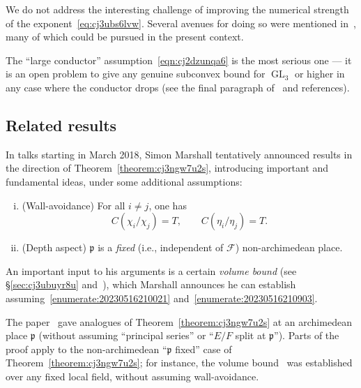 \documentclass[reqno]{amsart}
\DeclareMathOperator{\GL}{GL}
\theoremstyle{plain} \newtheorem{theorem} {Theorem} \newtheorem{conjecture} {Conjecture} \newtheorem{corollary} [theorem] {Corollary} \newtheorem{proposition} [theorem] {Proposition} \newtheorem{fact} [theorem] {Fact}
\theoremstyle{definition} \newtheorem{definition} [theorem] {Definition}
\theoremstyle{itplain} %
\newcommand{\mfp}{\mathfrak{p}}
\begin{document}
\begin{remark}\label{remark:cj3u9049bv}
  We do not address the interesting challenge of improving the numerical strength of the exponent~\eqref{eq:cj3ubs6lvw}.  Several avenues for doing so were mentioned in~\cite[Rmk 1.4]{2020arXiv201202187N}, many of which could be pursued in the present context.
\end{remark}
\begin{remark}\label{remark:cj3u9062fs}
  The ``large conductor'' assumption~\eqref{eqn:cj2dzunqa6} is the most serious one --- it is an open problem to give any genuine subconvex bound for $\GL_3$ or higher in any case where the conductor drops (see the final paragraph of~\cite[\S1.4]{2021arXiv210915230N} and references).
\end{remark}

\subsection{Related results}\label{sec:cj4vjryk3u}
In talks starting in March 2018, Simon Marshall tentatively announced results in the direction of Theorem~\ref{theorem:cj3ngw7u2s}, introducing important and fundamental ideas, under some additional assumptions:
\begin{enumerate}[(i)]
\item\label{enumerate:20230516210021} (Wall-avoidance) For all $i \neq j$, one has
  \begin{equation*}
    C(\chi_i / \chi_j) = T, \qquad C(\eta_i / \eta_j) = T. 
  \end{equation*}
\item\label{enumerate:20230516210903} (Depth aspect) $\mfp$ is a \emph{fixed} (i.e., independent of $\mathcal{F}$) non-archimedean place.
\end{enumerate}
An important input to his arguments is a certain \emph{volume bound} (see \S\ref{sec:cj3ubuyr8u} and~\cite[\S1.5]{2020arXiv201202187N}), which Marshall announces he can establish assuming~\eqref{enumerate:20230516210021} and~\eqref{enumerate:20230516210903}.

The paper~\cite{2020arXiv201202187N} gave analogues of Theorem~\ref{theorem:cj3ngw7u2s} at an archimedean place $\mfp$ (without assuming ``principal series'' or ``$E/F$ split at $\mathfrak{p}$'').  Parts of the proof apply to the non-archimedean ``$\mathfrak{p}$ fixed'' case of Theorem~\ref{theorem:cj3ngw7u2s}; for instance, the volume bound~\cite[Thm 15.2]{2020arXiv201202187N} was established over any fixed local field, without assuming wall-avoidance.
\end{document}
